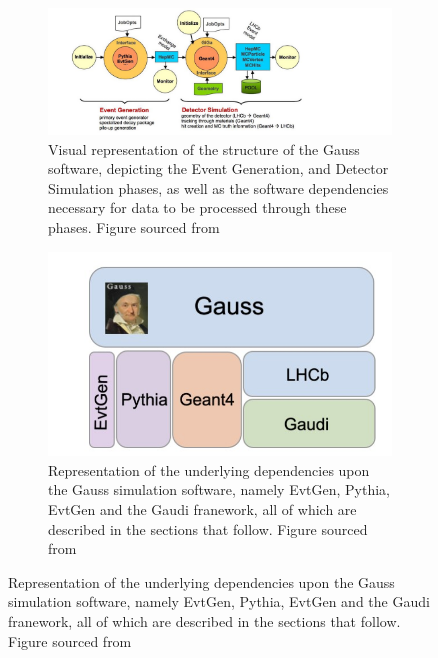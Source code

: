 \begin{figure}[H]
    \begin{subfigure}{0.5\textwidth}
    \includegraphics[scale = 0.5]{GaussSoftwareStructure.jpg}
    \caption{Visual representation of the structure of the Gauss software, depicting the Event Generation, and Detector Simulation phases, as well as the software dependencies necessary for data to be processed through these phases. Figure sourced from \cite{Belyaev_2011}}
    \label{GaussSoftwareStructure}
    \end{subfigure}
    \hfill
    \begin{subfigure}{0.4\textwidth}
        \includegraphics[scale = 0.55]{GaussDependenices.jpg}
        \caption{Representation of the underlying dependencies upon the Gauss simulation software, namely EvtGen, Pythia, EvtGen and the Gaudi franework, all of which are described in the sections that follow. Figure sourced from \cite{Tlustos:913827}}
        \label{GaussDependenices}
    \end{subfigure}
    \hfill
\end{figure}
